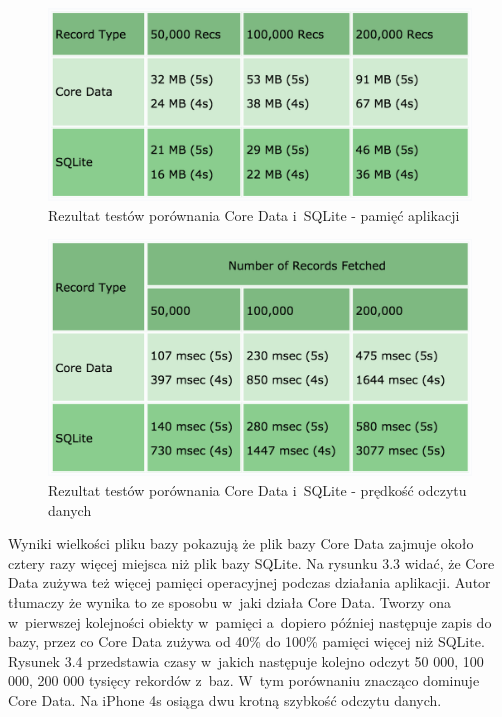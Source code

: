 \begin{figure}
\centering
	\includegraphics[width=13cm]{img/drdobbs_memory_test.png}
	\caption{Rezultat testów porównania Core Data i~SQLite - pamięć aplikacji}
	\label{fig: CoreData_SQLite_memory_test}
\end{figure}

\begin{figure}
\centering
	\includegraphics[width=13cm]{img/drdobbs_speed_test.png}
	\caption{Rezultat testów porównania Core Data i~SQLite - prędkość odczytu danych}
	\label{fig: CoreData_SQLite_speed_test}
\end{figure}
\clearpage

Wyniki wielkości pliku bazy pokazują że plik bazy Core Data zajmuje około cztery razy więcej miejsca niż plik bazy SQLite. Na rysunku 3.3 widać, że Core Data zużywa też więcej pamięci operacyjnej podczas działania aplikacji. Autor tłumaczy że wynika to ze sposobu w~jaki działa Core Data. Tworzy ona w~pierwszej kolejności obiekty w~pamięci a~dopiero później następuje zapis do bazy, przez co Core Data zużywa od 40\% do 100\% pamięci więcej niż SQLite. Rysunek 3.4 przedstawia czasy w~jakich następuje kolejno odczyt 50 000, 100 000, 200 000 tysięcy rekordów z~baz. W~tym porównaniu znacząco dominuje Core Data. Na iPhone 4s osiąga dwu krotną szybkość odczytu danych. 

